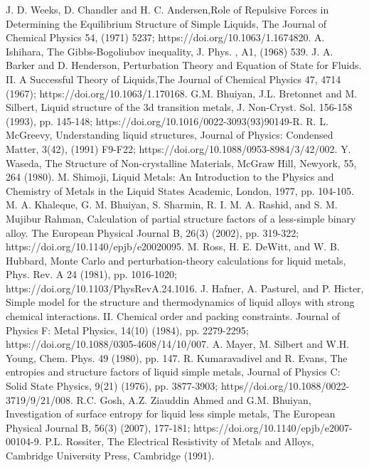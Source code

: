 \documentclass[final12pt]{elsarticle}
\begin{document}
\begin{thebibliography}{thesis}
J. D. Weeks, D. Chandler and H. C. Andersen,Role of Repulsive Forces in Determining the Equilibrium Structure of Simple Liquids, The Journal of Chemical Physics 54, (1971) 5237; https://doi.org/10.1063/1.1674820.
A. Ishihara, The Gibbs-Bogoliubov inequality, J. Phys. , A1, (1968) 539.
J. A. Barker and D. Henderson, Perturbation Theory and Equation of State for Fluids. II. A Successful Theory of Liquids,The Journal of Chemical Physics 47, 4714 (1967); https://doi.org/10.1063/1.170168.
G.M. Bhuiyan, J.L. Bretonnet and M. Silbert, Liquid structure of the 3d transition metals, J. Non-Cryst. Sol. 156-158 (1993), pp. 145-148; https://doi.org/10.1016/0022-3093(93)90149-R.
R. L. McGreevy, Understanding liquid structures, Journal of Physics: Condensed Matter, 3(42), (1991) F9-F22; https://doi.org/10.1088/0953-8984/3/42/002.
Y. Waseda, The Structure of Non-crystalline Materials, McGraw Hill, Newyork, 55, 264 (1980).
 M. Shimoji, Liquid Metals: An Introduction to the Physics and Chemistry of Metals in the Liquid States Academic, London, 1977, pp. 104-105.
M. A. Khaleque, G. M. Bhuiyan, S. Sharmin, R. I. M. A. Rashid, and S. M. Mujibur Rahman, Calculation of partial structure factors of a less-simple binary alloy. The European Physical Journal B, 26(3) (2002), pp. 319-322; https://doi.org/10.1140/epjb/e20020095.
M. Ross, H. E. DeWitt, and W. B. Hubbard, Monte Carlo and perturbation-theory calculations for liquid metals, Phys. Rev. A 24 (1981), pp. 1016-1020; https://doi.org/10.1103/PhysRevA.24.1016.
J. Hafner, A. Pasturel, and P. Hicter, Simple model for the structure and thermodynamics of liquid alloys with strong chemical interactions. II. Chemical order and packing constraints. Journal of Physics F: Metal Physics, 14(10) (1984), pp. 2279-2295; https://doi.org/10.1088/0305-4608/14/10/007.
A. Mayer, M. Silbert and W.H. Young, Chem. Phys. 49 (1980), pp. 147.
R. Kumaravadivel and R. Evans, The entropies and structure factors of liquid simple metals, Journal of Physics C: Solid State Physics, 9(21) (1976), pp. 3877-3903; https//doi.org/10.1088/0022-3719/9/21/008.
R.C. Gosh, A.Z. Ziauddin Ahmed and G.M. Bhuiyan, Investigation of surface entropy for liquid less simple metals, The European Physical Journal B, 56(3) (2007), 177-181; https://doi.org/10.1140/epjb/e2007-00104-9.
P.L. Rossiter, The Electrical Resistivity of Metals and Alloys, Cambridge University Press, Cambridge (1991).

\end{thebibliography}
\end{document}
